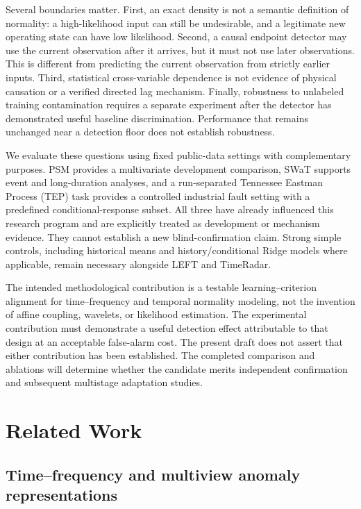 \documentclass[
  english,
]{article}
\begin{document}
Several boundaries matter. First, an exact density is not a semantic
definition of normality: a high-likelihood input can still be
undesirable, and a legitimate new operating state can have low
likelihood. Second, a causal endpoint detector may use the current
observation after it arrives, but it must not use later observations.
This is different from predicting the current observation from strictly
earlier inputs. Third, statistical cross-variable dependence is not
evidence of physical causation or a verified directed lag mechanism.
Finally, robustness to unlabeled training contamination requires a
separate experiment after the detector has demonstrated useful baseline
discrimination. Performance that remains unchanged near a detection
floor does not establish robustness.

We evaluate these questions using fixed public-data settings with
complementary purposes. PSM provides a multivariate development
comparison, SWaT supports event and long-duration analyses, and a
run-separated Tennessee Eastman Process (TEP) task provides a controlled
industrial fault setting with a predefined conditional-response subset.
All three have already influenced this research program and are
explicitly treated as development or mechanism evidence. They cannot
establish a new blind-confirmation claim. Strong simple controls,
including historical means and history/conditional Ridge models where
applicable, remain necessary alongside LEFT and TimeRadar.

The intended methodological contribution is a testable
learning--criterion alignment for time--frequency and temporal normality
modeling, not the invention of affine coupling, wavelets, or likelihood
estimation. The experimental contribution must demonstrate a useful
detection effect attributable to that design at an acceptable
false-alarm cost. The present draft does not assert that either
contribution has been established. The completed comparison and
ablations will determine whether the candidate merits independent
confirmation and subsequent multistage adaptation studies.

\section{Related Work}\label{related-work}

\subsection{Time--frequency and multiview anomaly
representations}\label{timefrequency-and-multiview-anomaly-representations}
\end{document}
